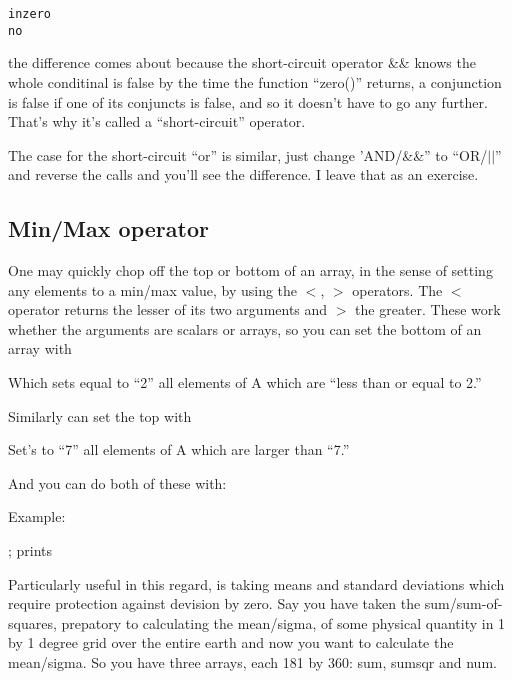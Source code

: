 \begin{alltt}
       in zero
       no
\end{alltt}

  the difference comes about  because the short-circuit operator \&\&
  knows the whole conditinal is false by the time the function
  ``zero()'' returns, a conjunction is false if one of its conjuncts is
  false, and so it doesn't have to go any further. That's why it's
  called a ``short-circuit'' operator.

The case for the short-circuit ``or'' is similar, just change 'AND/\&\&''
to ``OR/$||$'' and reverse the calls and you'll see the difference. I
leave that as an exercise.



\subsection{Min/Max operator}\label{sec:qs-Min-Max}

    One may quickly chop off the top or bottom of an array, in the sense
    of setting any elements to a min/max value, by using the
    $<$, $>$ operators. The $<$ operator returns the lesser of its
    two arguments and $>$ the greater. These work whether the
    arguments are scalars or arrays, so you can set the bottom of an
    array with


    Which sets equal to ``2'' all elements of A which are ``less than
    or equal to 2.''

    Similarly can set the top with


    Set's to ``7'' all elements of A which are larger than ``7.'' 

    And you can do both of these with:


    Example:

     ; prints


    Particularly useful in this regard, is taking means and standard
    deviations which require protection against devision by zero. Say
    you have taken the sum/sum-of-squares, prepatory to calculating
    the mean/sigma, of some physical quantity in 1 by 1 degree grid
    over the entire earth  and now you want to calculate the
    mean/sigma. So you have three arrays, each 181 by 360: sum, sumsqr
    and num. 

